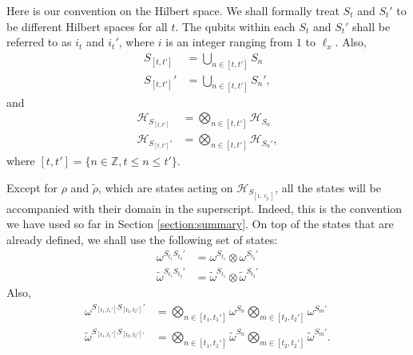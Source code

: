 \documentclass[prx,aps,amsmath,amssymb,floatfix,superscriptaddress,11pt,tightenlines,longbibliography,onecolumn,notitlepage]{revtex4-1}
\begin{document}
Here is our convention on the Hilbert space. We shall formally treat $S_t$ and $S_t'$ to be different Hilbert spaces for all $t$. The qubits within each $S_t$ and $S_t'$ shall be referred to as $i_t$ and $i_t'$, where $i$ is an integer ranging from $1$ to $\ell_x$. Also,
\begin{equation}
  \begin{aligned}
    S_{[t,t']} &= \bigcup_{n\in [t,t']} S_n \\
    S_{[t,t']}' &= \bigcup_{n\in [t,t']} S_n',
  \end{aligned}  
\end{equation}
and
\begin{equation}
  \begin{aligned}
    \mathcal{H}_{S_{[t,t']}} &= \bigotimes_{n\in [t,t']} \mathcal{H}_{S_n} \\
    \mathcal{H}_{S_{[t,t']}'} &= \bigotimes_{n\in [t,t']} \mathcal{H}_{S_n'},
  \end{aligned}
\end{equation}
where $[t,t'] = \{n \in \mathbb{Z}, t\leq n\leq t'  \}.$

Except for $\rho$ and $\tilde{\rho}$, which are states acting on $\mathcal{H}_{S_{[1,\ell_y]}}$, all the states will be accompanied with their domain in the superscript. Indeed, this is the convention we have used so far in Section \ref{section:summary}. On top of the states that are already defined, we shall use the following set of states:
\begin{equation}
  \begin{aligned}
  \omega^{S_{t_1}S_{t_2}'} &= \omega^{S_{t_1}} \otimes \omega^{S_{t_2}'} \\
  \tilde{\omega}^{S_{t_1}S_{t_2}'} &= \tilde{\omega}^{S_{t_1}} \otimes \tilde{\omega}^{S_{t_2}'}
  \end{aligned}
\end{equation}
Also,
\begin{equation}
  \begin{aligned}
    \omega^{S_{[t_1,t_1']}S_{[t_2,t_2']}'} &= \bigotimes_{n\in [t_1,t_1']} \omega^{S_n}  \bigotimes_{m\in [t_2,t_2']} \omega^{S_m'}\\
    \tilde{\omega}^{S_{[t_1,t_1']}S_{[t_2,t_2']'}} &= \bigotimes_{n\in [t_1,t_1']} \tilde{\omega}^{S_n} \bigotimes_{m\in [t_2,t_2']} \tilde{\omega}^{S_{m}'}.
  \end{aligned}
\end{equation}
\end{document}
